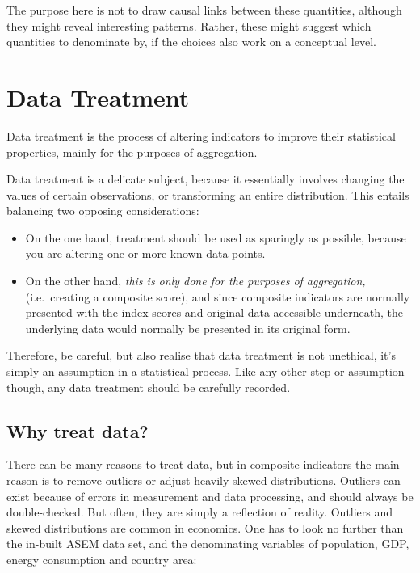 \documentclass[
]{book}
\providecommand{\tightlist}{%
  \setlength{\itemsep}{0pt}\setlength{\parskip}{0pt}}
\begin{document}
The purpose here is not to draw causal links between these quantities, although they might reveal interesting patterns. Rather, these might suggest which quantities to denominate by, if the choices also work on a conceptual level.

\hypertarget{data-treatment}{%
\chapter{Data Treatment}\label{data-treatment}}

Data treatment is the process of altering indicators to improve their statistical properties, mainly for the purposes of aggregation.

Data treatment is a delicate subject, because it essentially involves changing the values of certain observations, or transforming an entire distribution. This entails balancing two opposing considerations:

\begin{itemize}
\tightlist
\item
  On the one hand, treatment should be used as sparingly as possible, because you are altering one or more known data points.
\item
  On the other hand, \emph{this is only done for the purposes of aggregation,} (i.e.~creating a composite score), and since composite indicators are normally presented with the index scores and original data accessible underneath, the underlying data would normally be presented in its original form.
\end{itemize}

Therefore, be careful, but also realise that data treatment is not unethical, it's simply an assumption in a statistical process. Like any other step or assumption though, any data treatment should be carefully recorded.

\hypertarget{why-treat-data}{%
\section{Why treat data?}\label{why-treat-data}}

There can be many reasons to treat data, but in composite indicators the main reason is to remove outliers or adjust heavily-skewed distributions. Outliers can exist because of errors in measurement and data processing, and should always be double-checked. But often, they are simply a reflection of reality. Outliers and skewed distributions are common in economics. One has to look no further than the in-built ASEM data set, and the denominating variables of population, GDP, energy consumption and country area:
\end{document}
